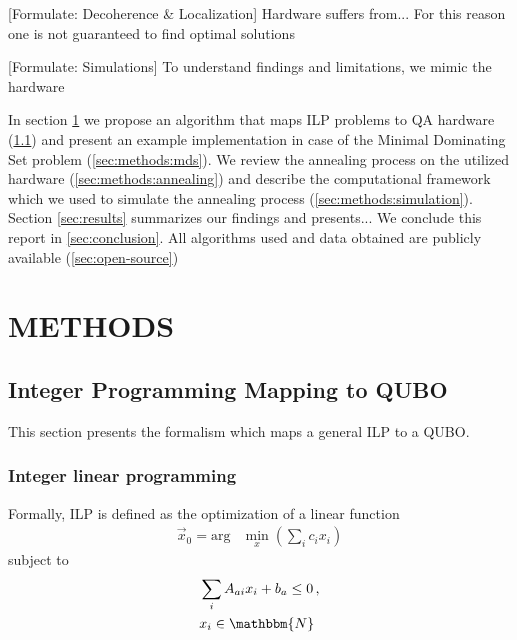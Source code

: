 \documentclass[prd,twocolumn,tightenlines,preprintnumbers,showpacs,superscriptaddress,notitlepage,nofootinbib,eqsecnum,floatfix,longbibliography]{revtex4}
\begin{document}
\alert{[Formulate: Decoherence \& Localization]}
Hardware suffers from...
For this reason one is not guaranteed to find optimal solutions

\alert{[Formulate: Simulations]}
To understand findings and limitations, we mimic the hardware

In section \ref{sec:methods} we propose an algorithm that maps ILP problems to QA hardware (\ref{sec:methods:ilp}) and present an example implementation in case of the Minimal Dominating Set problem (\ref{sec:methods:mds}).
We review the annealing process on the utilized hardware (\ref{sec:methods:annealing}) and describe the computational framework which we used to simulate the annealing process (\ref{sec:methods:simulation}).
Section \ref{sec:results} summarizes our findings and presents...
We conclude this report in \ref{sec:conclusion}.
All algorithms used and data obtained are publicly available (\ref{sec:open-source})




\section{METHODS}
\label{sec:methods}

\subsection{Integer Programming Mapping to QUBO}
\label{sec:methods:ilp}

This section presents the formalism which maps a general ILP to a QUBO.

\subsubsection{Integer linear programming}
\label{sec:methods:ilp-def}
Formally, ILP is defined as the optimization of a linear function
\begin{align}
    \label{eq:initial-ip-def}
    \vec x_0 = \mathrm{arg} &\min\limits_{x}(\sum_i c_i x_i)
\end{align}
subject to
\begin{align}
    \label{eq:ilp-constraints}
    &\sum_i A_{ai}x_i +b_a \leq 0 \,,\\
    & x_i  \in \mathbbm{N}
\end{align}
\end{document}
